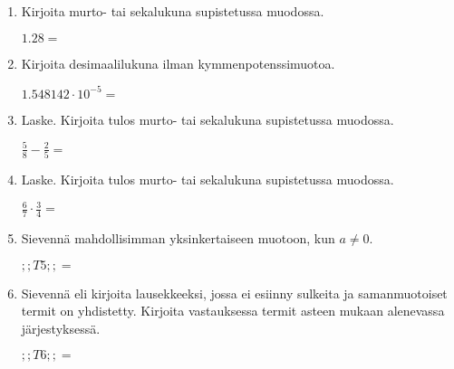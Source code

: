 \documentclass[finnish, a4paper, 12pt]{article}
\begin{document}
	\begin{enumerate}[leftmargin=*]
		\setlength\itemsep{1em}
		
		\item %
		Kirjoita murto- tai sekalukuna supistetussa muodossa. 
		
		\(
		1.28 = 
		\) %
		
		\vspace{8pt}
		
		\item %
		Kirjoita desimaalilukuna ilman kymmenpotenssimuotoa. 
		
		\(
		1.548142\cdot 10^{-5} = 
		\) %
		
		\vspace{8pt}
		
		\item %
		Laske. Kirjoita tulos murto- tai sekalukuna supistetussa muodossa.
		
		\(
		\displaystyle
		\frac{5}{8}-\frac{2}{5} = 
		\) %
		
		\vspace{8pt}
		
		\item %
		Laske. Kirjoita tulos murto- tai sekalukuna supistetussa muodossa.
		
		\(
		\displaystyle
		\frac{6}{7}\cdot\frac{3}{4} = 
		\) %
		
		\vspace{8pt}
		
		\item %
		Sievennä mahdollisimman yksinkertaiseen muotoon, kun \(a \not = 0\). 
		
		\(
		\displaystyle
		;;T5;; =
		\phantom{mmmmmmmmmmmmmmm}
		\) %
		
		\vspace{8pt}
		
		\item %
		Sievennä eli kirjoita lausekkeeksi, jossa ei esiinny sulkeita ja 
		samanmuotoiset termit on yhdistetty. 
		Kirjoita vastauksessa termit asteen mukaan alenevassa järjestyksessä. 
		
		\(
		\displaystyle
		;;T6;; = 
		\) %
		

\end{enumerate}
\end{document}
